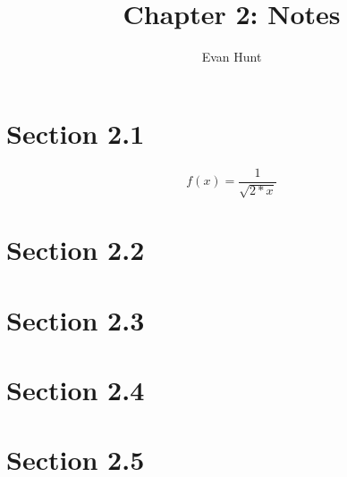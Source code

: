 \documentclass[12pt]{article}
\title{Chapter 2: Notes}
\author{Evan Hunt}
\begin{document}
    \maketitle

    \section[]{Section 2.1}
        \begin{equation}
            f(x) = \frac{1}{\sqrt{2*x}}
        \end{equation}
    \section[]{Section 2.2}
    \section[]{Section 2.3}
    \section[]{Section 2.4}
    \section[]{Section 2.5}
\end{document}
